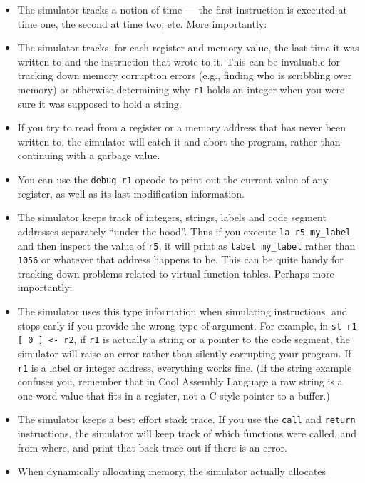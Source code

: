 \documentclass[]{article}
\begin{document}
\begin{itemize}
\itemsep1pt\parskip0pt
\item
  The simulator tracks a notion of time --- the first instruction is
  executed at time one, the second at time two, etc. More importantly:
\item
  The simulator tracks, for each register and memory value, the last
  time it was written to and the instruction that wrote to it. This can
  be invaluable for tracking down memory corruption errors (e.g.,
  finding who is scribbling over memory) or otherwise determining why
  \texttt{r1} holds an integer when you were sure it was supposed to
  hold a string.
\item
  If you try to read from a register or a memory address that has never
  been written to, the simulator will catch it and abort the program,
  rather than continuing with a garbage value.
\item
  You can use the \texttt{debug r1} opcode to print out the current
  value of any register, as well as its last modification information.
\item
  The simulator keeps track of integers, strings, labels and code
  segment addresses separately ``under the hood''. Thus if you execute
  \texttt{la r5 my\_label} and then inspect the value of \texttt{r5}, it
  will print as \texttt{label my\_label} rather than \texttt{1056} or
  whatever that address happens to be. This can be quite handy for
  tracking down problems related to virtual function tables. Perhaps
  more importantly:
\item
  The simulator uses this type information when simulating instructions,
  and stops early if you provide the wrong type of argument. For
  example, in \texttt{st r1 {[} 0 {]} \textless{}- r2}, if \texttt{r1}
  is actually a string or a pointer to the code segment, the simulator
  will raise an error rather than silently corrupting your program. If
  \texttt{r1} is a label or integer address, everything works fine. (If
  the string example confuses you, remember that in Cool Assembly
  Language a raw string is a one-word value that fits in a register, not
  a C-style pointer to a buffer.)
\item
  The simulator keeps a best effort stack trace. If you use the
  \texttt{call} and \texttt{return} instructions, the simulator will
  keep track of which functions were called, and from where, and print
  that back trace out if there is an error.
\item
  When dynamically allocating memory, the simulator actually allocates

\end{itemize}
\end{document}
